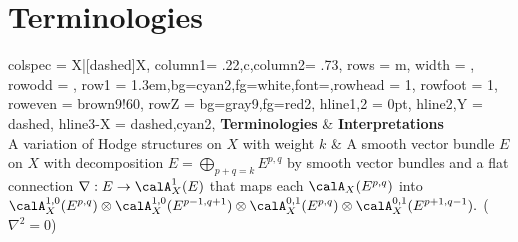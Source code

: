 \documentclass[lang=en,12pt]{beautybook}
\begin{document}
\section{Terminologies}
\vspace{-\baselineskip}
\begin{center}
  \begin{tblr}[long,theme = fancy,
    caption = {Terminologies Interpretation},
    entry = {Interpretation},
    label = {tblr:Terminologies Interpretation 3},
    note{a} = {For every $p,q$ and every $\alpha\in \bR^\nu$, the prolongation bundles $\calP_\alpha E^{p,q}$ satisfy the folllowing properties: \newline 1. $\calP_\alpha E^{p,q}$ is a locally free sheaf,\newline 2. By Nilpotent Orbit theorem, $E^{p,q}$ can be naturally identified to $\calP_\alpha E^{p,q}$, which is the prolongation bundle via growth of Higgs norm.},
    ]
    {
    colspec = {X|[dashed]X}, %
    column{1}= {.22\linewidth,c},column{2}= {.73\linewidth}, rows = {m},
    width = \linewidth,
    row{odd} = {},
    row{1} = {1.3em,bg=cyan2,fg=white,font=\large\bfseries\sffamily},rowhead = 1, rowfoot = 1,
    row{even} = {brown9!60}, row{Z} = {bg=gray9,fg=red2},
    hline{1,2} = {0pt},
    hline{2,Y} = {dashed},
        hline{3-X} = {dashed,cyan2},
      }
    \textbf{Terminologies}                                                               & \textbf{Interpretations}                                                                                                                                                                                                                                                                                                                                                                                                                                                                                                                                                              \\
    A variation of Hodge structures on $X$ with weight $k$                               & A smooth vector bundle $E$ on $X$ with decomposition
    $E=\bigoplus_{p+q=k} E^{p,q}$
    by smooth vector bundles and a flat connection $\nabla: E\to \calA_X^1(E)$ that maps each $\calA_X(E^{p,q})$ into
    $\displaystyle\calA_X^{1,0}(E^{p,q})\otimes\calA_X^{1,0}(E^{p-1,q+1})\otimes\calA_X^{0,1}(E^{p,q})\otimes\calA_X^{0,1}(E^{p+1,q-1}).$ \quad ($\nabla^2=0$)                                                                                                                                                                                                                                                                                                                                                                                                                                                                                                                   \\

\end{tblr}
\end{center}
\end{document}
